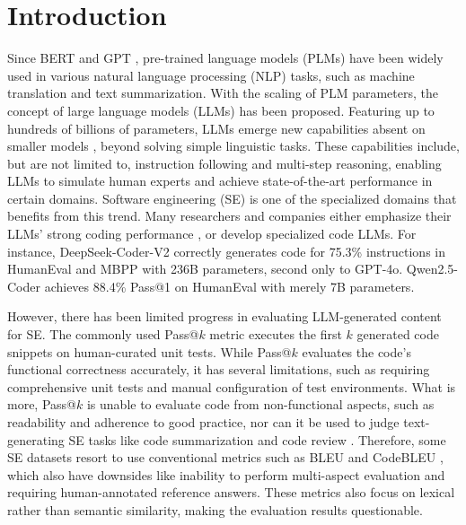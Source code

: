 \section{Introduction\label{intro}}
Since BERT \cite{DBLP:conf/naacl/DevlinCLT19} and GPT \cite{radford2018improving}, pre-trained language models (PLMs) have been widely used in various natural language processing (NLP) tasks, such as machine translation and text summarization. With the scaling of PLM parameters, the concept of large language models (LLMs) has been proposed. Featuring up to hundreds of billions of parameters, LLMs emerge new capabilities absent on smaller models \cite{DBLP:journals/tmlr/WeiTBRZBYBZMCHVLDF22}, beyond solving simple linguistic tasks. These capabilities include, but are not limited to, instruction following and multi-step reasoning, enabling LLMs to simulate human experts and achieve state-of-the-art performance in certain domains. Software engineering (SE) is one of the specialized domains that benefits from this trend. Many researchers and companies either emphasize their LLMs' strong coding performance \cite{DBLP:journals/corr/abs-2303-08774,DBLP:journals/corr/abs-2403-05530}, or develop specialized code LLMs. For instance, DeepSeek-Coder-V2 \cite{DBLP:journals/corr/abs-2406-11931} correctly generates code for 75.3\% instructions in HumanEval \cite{DBLP:journals/corr/abs-2107-03374} and MBPP \cite{DBLP:journals/corr/abs-2108-07732} with 236B parameters, second only to GPT-4o. Qwen2.5-Coder \cite{hui2024qwen2} achieves 88.4\% Pass@1 on HumanEval with merely 7B parameters. 

However, there has been limited progress in evaluating LLM-generated content for SE. The commonly used Pass@\(k\) metric executes the first \(k\) generated code snippets on human-curated unit tests. While Pass@\(k\) evaluates the code's functional correctness accurately, it has several limitations, such as requiring comprehensive unit tests and manual configuration of test environments. What is more, Pass@\(k\) is unable to evaluate code from non-functional aspects, such as readability and adherence to good practice, nor can it be used to judge text-generating SE tasks like code summarization and code review \cite{DBLP:journals/corr/abs-2308-10620}. Therefore, some SE datasets \cite{DBLP:journals/corr/abs-2409-10280,DBLP:conf/emnlp/YanTLCW23} resort to use conventional metrics such as BLEU \cite{DBLP:conf/acl/PapineniRWZ02} and CodeBLEU \cite{DBLP:journals/corr/abs-2009-10297}, which also have downsides like inability to perform multi-aspect evaluation and requiring human-annotated reference answers. These metrics also focus on lexical rather than semantic similarity, making the evaluation results questionable.

